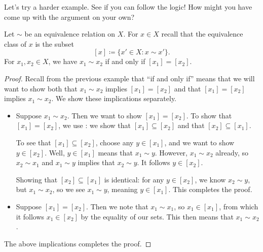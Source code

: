 \documentclass[../notes.tex]{subfiles}
\begin{document}
Let's try a harder example. See if you can follow the logic! How might you have come up with the argument on your own?
\begin{example} \label{ex:equiv-partition}
    Let $\sim$ be an equivalence relation on $X$. For $x\in X$ recall that the equivalence class of $x$ is the subset
    \[[x]\coloneqq\{x'\in X:x\sim x'\}.\]
    For $x_1,x_2\in X$, we have $x_1\sim x_2$ if and only if $[x_1]=[x_2]$.
\end{example}
\begin{proof}
    Recall from the previous example that ``if and only if'' means that we will want to show both that $x_1\sim x_2$ implies $[x_1]=[x_2]$ and that $[x_1]=[x_2]$ implies $x_1\sim x_2$. We show these implications separately.
    \begin{itemize}
        \item Suppose $x_1\sim x_2$. Then we want to show $[x_1]=[x_2]$. To show that $[x_1]=[x_2]$, we use : we show that $[x_1]\subseteq[x_2]$ and that $[x_2]\subseteq[x_1]$.

        To see that $[x_1]\subseteq[x_2]$, choose any $y\in[x_1]$, and we want to show $y\in[x_2]$. Well, $y\in[x_1]$ means that $x_1\sim y$. However, $x_1\sim x_2$ already, so $x_2\sim x_1$ and $x_1\sim y$ implies that $x_2\sim y$. It follows $y\in[x_2]$.

        Showing that $[x_2]\subseteq[x_1]$ is identical: for any $y\in[x_2]$, we know $x_2\sim y$, but $x_1\sim x_2$, so we see $x_1\sim y$, meaning $y\in[x_1]$. This completes the proof.

        \item Suppose $[x_1]=[x_2]$. Then we note that $x_1\sim x_1$, so $x_1\in[x_1]$, from which it follows $x_1\in[x_2]$ by the equality of our sets. This then means that $x_1\sim x_2$.
    \end{itemize}
    The above implications completes the proof.
\end{proof}
\end{document}
